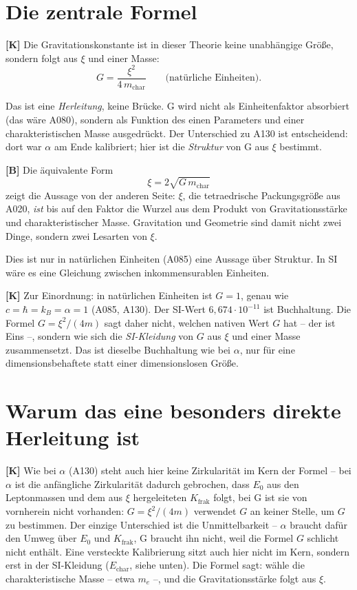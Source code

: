 \section{Die zentrale Formel}

\textbf{[K]} Die Gravitationskonstante ist in dieser Theorie keine unabhängige
Größe, sondern folgt aus $\xi$ und einer Masse:
\[
  G = \frac{\xi^2}{4\,m_\text{char}} \qquad\text{(natürliche Einheiten)}.
\]

Das ist eine \emph{Herleitung}, keine Brücke. G wird nicht als Einheitenfaktor
absorbiert (das wäre A080), sondern als Funktion des einen Parameters und einer
charakteristischen Masse ausgedrückt. Der Unterschied zu A130 ist
entscheidend: dort war $\alpha$ am Ende kalibriert; hier ist die
\emph{Struktur} von G aus $\xi$ bestimmt.

\textbf{[B]} Die äquivalente Form
\[
  \xi = 2\sqrt{G\,m_\text{char}}
\]
zeigt die Aussage von der anderen Seite: $\xi$, die tetraedrische
Packungsgröße aus A020, \emph{ist} bis auf den Faktor die Wurzel aus dem Produkt
von Gravitationsstärke und charakteristischer Masse. Gravitation und Geometrie
sind damit nicht zwei Dinge, sondern zwei Lesarten von $\xi$.

Dies ist nur in natürlichen Einheiten (A085) eine Aussage über Struktur. In SI
wäre es eine Gleichung zwischen inkommensurablen Einheiten.

\textbf{[K]} Zur Einordnung: in natürlichen Einheiten ist $G = 1$, genau wie
$c = \hbar = k_B = \alpha = 1$ (A085, A130). Der SI-Wert $6{,}674\cdot10^{-11}$
ist Buchhaltung. Die Formel $G = \xi^2/(4m)$ sagt daher nicht, welchen nativen
Wert $G$ hat -- der ist Eins --, sondern wie sich die \emph{SI-Kleidung} von $G$
aus $\xi$ und einer Masse zusammensetzt. Das ist dieselbe Buchhaltung wie bei
$\alpha$, nur für eine dimensionsbehaftete statt einer dimensionslosen Größe.

\section{Warum das eine besonders direkte Herleitung ist}

\textbf{[K]} Wie bei $\alpha$ (A130) steht auch hier keine Zirkularität im Kern
der Formel -- bei $\alpha$ ist die anfängliche Zirkularität dadurch gebrochen,
dass $E_0$ aus den Leptonmassen und dem aus $\xi$ hergeleiteten $K_\text{frak}$
folgt, bei G ist sie von vornherein nicht vorhanden: $G = \xi^2/(4m)$ verwendet
$G$ an keiner Stelle, um $G$ zu bestimmen. Der einzige Unterschied ist die
Unmittelbarkeit -- $\alpha$ braucht dafür den Umweg über $E_0$ und
$K_\text{frak}$, G braucht ihn nicht, weil die Formel $G$ schlicht nicht
enthält. Eine versteckte Kalibrierung sitzt auch hier nicht im Kern,
sondern erst in der SI-Kleidung ($E_\text{char}$, siehe unten). Die Formel sagt:
wähle die charakteristische Masse -- etwa $m_e$ --, und die Gravitationsstärke
folgt aus $\xi$.

